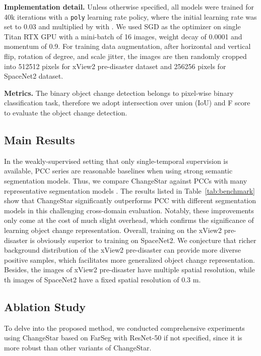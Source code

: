 \documentclass[10pt,twocolumn,letterpaper]{article}
\begin{document}
\vspace{-0.05in}
\noindent\textbf{Implementation detail.}
Unless otherwise specified, all models were trained for 40k iterations with a \texttt{poly} learning rate policy, where the initial learning rate was set to 0.03 and multiplied by  with .
We used SGD as the optimizer on single Titan RTX GPU with a mini-batch of 16 images, weight decay of 0.0001 and momentum of 0.9.
For training data augmentation, after horizontal and vertical flip, rotation of  degree, and scale jitter, the images are then randomly cropped into 512512 pixels for xView2 pre-disaster dataset and 256256 pixels for SpaceNet2 dataset.


\noindent\textbf{Metrics.}
The binary object change detection belongs to pixel-wise binary classification task, therefore we adopt intersection over union (IoU) and F score to evaluate the object change detection.

\subsection{Main Results}
In the weakly-supervised setting that only single-temporal supervision is available, PCC series are reasonable baselines when using strong semantic segmentation models.
Thus, we compare ChangeStar against PCCs with many representative segmentation models \cite{zhao2017pyramid,chen2017rethinking,chen2018encoder,kirillov2019panoptic,zheng2020foreground}.
The results listed in Table~\ref{tab:benchmark} show that ChangeStar significantly outperforms PCC with different segmentation models in this challenging cross-domain evaluation.
Notably, these improvements only come at the cost of much slight overhead, which confirms the significance of learning object change representation.
Overall, training on the xView2 pre-disaster is obviously superior to training on SpaceNet2.
We conjecture that richer background distribution of the xView2 pre-disaster can provide more diverse positive samples, which facilitates more generalized object change representation.
Besides, the images of xView2 pre-disaster have multiple spatial resolution, while th images of SpaceNet2 have a fixed spatial resolution of 0.3 m.

\subsection{Ablation Study}
To delve into the proposed method, we conducted comprehensive experiments using ChangeStar based on FarSeg with ResNet-50 if not specified, since it is more robust than other variants of ChangeStar.
\end{document}
